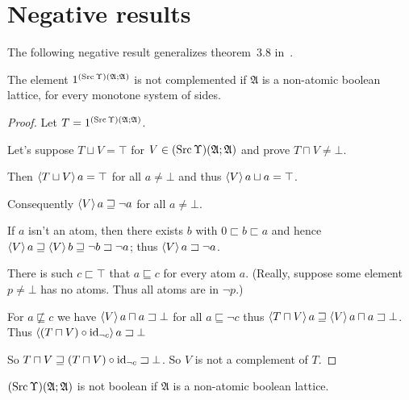 
\section{Negative results}

The following negative result generalizes theorem~3.8 in~\cite{tprod-dist-lat}.

\begin{thm}\label{neg-prod}
  The element $1^{(\operatorname{Src}\Upsilon)(\mathfrak{A}; \mathfrak{A})}$ is not
  complemented if $\mathfrak{A}$ is a non-atomic boolean lattice,
  for every monotone system of sides.
\end{thm}

\begin{proof}
  Let $T = 1^{(\operatorname{Src}\Upsilon)(\mathfrak{A}; \mathfrak{A})}$.
  
  Let's suppose $T \sqcup V = \top$ for $V \in (\operatorname{Src}\Upsilon) (\mathfrak{A};
  \mathfrak{A})$ and prove $T \sqcap V \neq \bot$.
  
  Then $\left\langle T \sqcup V\right\rangle a = \top$ for all $a \neq \bot$ and thus $\left\langle V\right\rangle
  a \sqcup a = \top$.
  
  Consequently $\left\langle V\right\rangle a \sqsupseteq \neg a$ for all $a \neq \bot$.
  
  If $a$ isn't an atom, then there exists $b$ with $0 \sqsubset b \sqsubset a$
  and hence $\left\langle V\right\rangle a \sqsupseteq \left\langle V\right\rangle b \sqsupseteq \neg b \sqsupset \neg a$;
  thus $\left\langle V\right\rangle a \sqsupset \neg a$.
  
  There is such $c\sqsubset\top$ that $a \sqsubseteq c$ for every atom $a$. (Really,
  suppose some element $p \neq \bot$ has no atoms. Thus all atoms are in $\neg
  p$.)
  
  For $a \nsqsubseteq c$ we have $\left\langle V\right\rangle a \sqcap a \sqsupset \bot$
  for all $a \sqsubseteq \neg c$ thus $\left\langle T \sqcap V\right\rangle a \sqsupseteq
  \left\langle V\right\rangle a \sqcap a \sqsupset \bot$. Thus $\left\langle (T \sqcap V) \circ
  \operatorname{id}_{\neg c}\right\rangle a \sqsupset \bot$
  
  So $T \sqcap V \sqsupseteq (T \sqcap V) \circ \operatorname{id}_{\neg c} \sqsupset
  \bot$. So $V$ is not a complement of $T$.
\end{proof}

\begin{cor}
  $(\operatorname{Src}\Upsilon)(\mathfrak{A}; \mathfrak{A})$ is not boolean if $\mathfrak{A}$
  is a non-atomic boolean lattice.
\end{cor}

